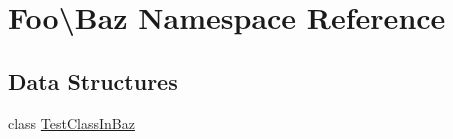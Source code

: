 \hypertarget{namespace_foo_1_1_baz}{}\section{Foo\textbackslash{}Baz Namespace Reference}
\label{namespace_foo_1_1_baz}
\subsection*{Data Structures}
\begin{DoxyCompactItemize}
\item 
class \mbox{\hyperlink{class_foo_1_1_baz_1_1_test_class_in_baz}{Test\+Class\+In\+Baz}}
\end{DoxyCompactItemize}
